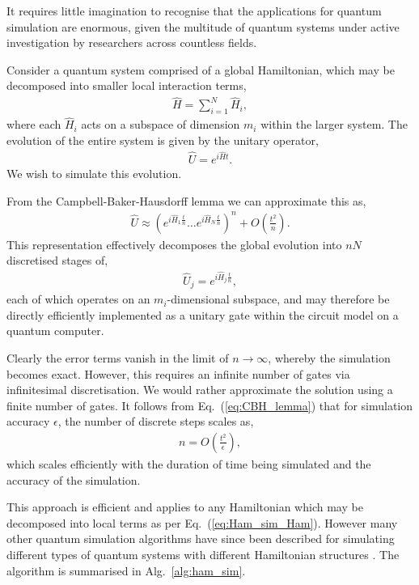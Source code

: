 It requires little imagination to recognise that the applications for quantum simulation are enormous, given the multitude of quantum systems under active investigation by researchers across countless fields.

Consider a quantum system comprised of a global Hamiltonian, which may be decomposed into smaller local interaction terms,
\begin{align} \label{eq:Ham_sim_Ham}
\hat{H} = \sum_{i=1}^N \hat{H}_i	,
\end{align}
where each $\hat{H}_i$ acts on a subspace of dimension $m_i$ within the larger system. The evolution of the entire system is given by the unitary operator,
\begin{align}
\hat{U} = e^{i\hat{H}t}.
\end{align}
We wish to simulate this evolution.

From the Campbell-Baker-Hausdorff lemma we can approximate this as,
\begin{align}\label{eq:CBH_lemma}
	\hat{U} \approx \left(e^{i\hat{H}_1\frac{t}{n}}\dots e^{i\hat{H}_N\frac{t}{n}}\right)^n + O\left(\frac{t^2}{n}\right).
\end{align}
This representation effectively decomposes the global evolution into $nN$ discretised stages of,
\begin{align}
	\hat{U}_j = e^{i\hat{H}_j\frac{t}{n}},
\end{align}
each of which operates on an $m_i$-dimensional subspace, and may therefore be directly efficiently implemented as a unitary gate within the circuit model on a quantum computer. 

Clearly the error terms vanish in the limit of \mbox{$n\to\infty$}, whereby the simulation becomes exact. However, this requires an infinite number of gates via infinitesimal discretisation. We would rather approximate the solution using a finite number of gates. It follows from Eq.~(\ref{eq:CBH_lemma}) that for simulation accuracy $\epsilon$, the number of discrete steps scales as,
\begin{align}
n = O\left(\frac{t^2}{\epsilon}\right),
\end{align}
which scales efficiently with the duration of time being simulated and the accuracy of the simulation.

This approach is efficient and applies to any Hamiltonian which may be decomposed into local terms as per Eq.~(\ref{eq:Ham_sim_Ham}). However many other quantum simulation algorithms have since been described for simulating different types of quantum systems with different Hamiltonian structures \cite{bib:JLP, bib:RohdeWavelet15}. The algorithm is summarised in Alg.~\ref{alg:ham_sim}.


